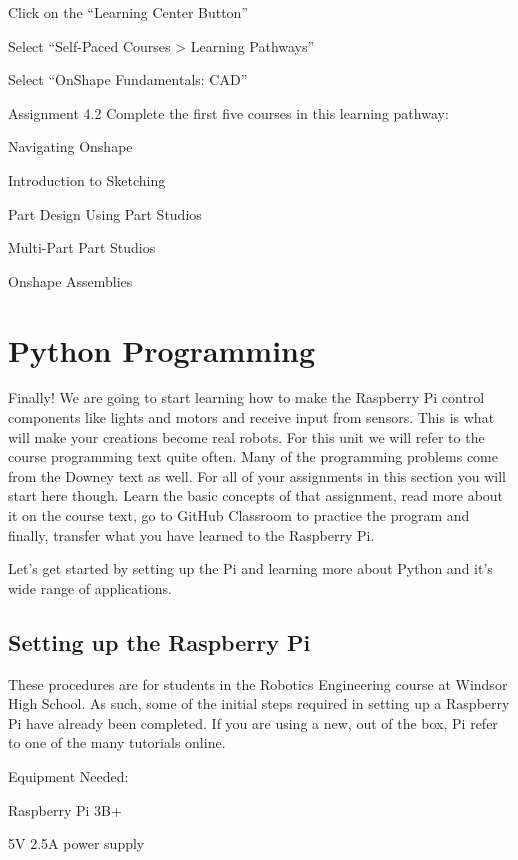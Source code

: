 \documentclass[
]{book}
\begin{document}
Click on the ``Learning Center Button''

Select ``Self-Paced Courses \textgreater{} Learning Pathways''

Select ``OnShape Fundamentals: CAD''

Assignment 4.2
Complete the first five courses in this learning pathway:

Navigating Onshape

Introduction to Sketching

Part Design Using Part Studios

Multi-Part Part Studios

Onshape Assemblies

\hypertarget{python-programming}{%
\chapter{Python Programming}\label{python-programming}}

Finally! We are going to start learning how to make the Raspberry Pi control components like lights and motors and receive input from sensors. This is what will make your creations become real robots. For this unit we will refer to the course programming text quite often. Many of the programming problems come from the Downey text as well. For all of your assignments in this section you will start here though. Learn the basic concepts of that assignment, read more about it on the course text, go to GitHub Classroom to practice the program and finally, transfer what you have learned to the Raspberry Pi.

Let's get started by setting up the Pi and learning more about Python and it's wide range of applications.

\hypertarget{setting-up-the-raspberry-pi}{%
\section{Setting up the Raspberry Pi}\label{setting-up-the-raspberry-pi}}

These procedures are for students in the Robotics Engineering course at Windsor High School. As such, some of the initial steps required in setting up a Raspberry Pi have already been completed. If you are using a new, out of the box, Pi refer to one of the many tutorials online.

Equipment Needed:

Raspberry Pi 3B+

5V \textbar{} 2.5A power supply
\end{document}

